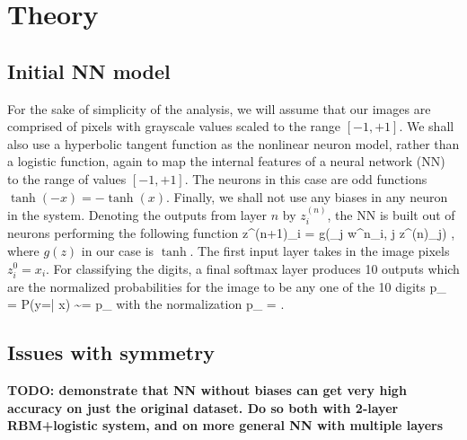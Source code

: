 \documentclass[twocolumn, prl]{revtex4-1}
\begin{document}



\section{Theory}
\label{Sec:theory}
\subsection{Initial NN model}
\label{Sec:dumb_NN}

For the sake of simplicity of the analysis, we will assume that our images are comprised of pixels with grayscale values scaled to the 
range $[-1,+1]$. We shall also use a hyperbolic tangent function as the nonlinear neuron model, rather than a logistic function, again to map the internal features of a neural network (NN) to the range of values $[-1, +1]$. The neurons in this case are odd functions $\tanh(-x) = - \tanh(x)$.
Finally, we shall not use any biases in any neuron in the system. Denoting the outputs from layer $n$ by $z^{(n)}_i$, the NN is built out of neurons performing the following function
\be
z^{(n+1)}_i = g\left(\sum_j w^n_{i, j} z^{(n)}_j\right)
\; ,
\ee
where $g(z)$ in our case is $\tanh$.
The first input layer takes in the image pixels $z^0_i = x_i$. For classifying the digits, a final softmax layer produces 10 outputs which are the normalized probabilities for the image to be any one of the 10 digits
\be
p_{\alpha} = P(y=\alpha | x) \sim \exp{} = {\tilde p}_{\alpha}
\ee
with the normalization
\be
p_{\alpha} = 
\; .
\ee

\subsection{Issues with symmetry}

{\bf TODO: demonstrate that NN without biases can get very high accuracy on just the original dataset. Do so both with 2-layer RBM+logistic system, and on more general NN with multiple layers}
\end{document}
